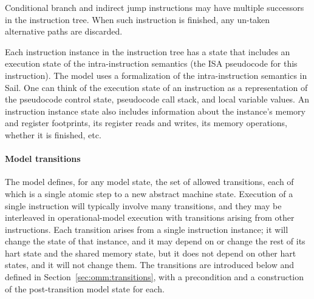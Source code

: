 Conditional branch and indirect jump instructions may have multiple successors in the instruction tree.
When such instruction is finished, any un-taken alternative paths are discarded.

Each instruction instance in the instruction tree has a state that
includes an execution state of the intra-instruction semantics (the
ISA pseudocode for this instruction).
The model uses a formalization of the intra-instruction semantics in Sail.
One can think of the execution state of an instruction as a representation of the pseudocode control state, pseudocode call stack, and local variable values.
An instruction instance state also includes information about the instance's memory and register footprints, its register reads and writes, its memory operations, whether it is finished, etc.

\paragraph{Model transitions}
The model defines, for any model state, the set of allowed transitions, each of which is a single atomic step to a new abstract machine state.
Execution of a single instruction will typically involve many
transitions, and they may be interleaved in operational-model
execution with transitions arising from other instructions. 
Each transition arises from a single instruction instance; it will
change the state of that instance, and it may depend on or change the
rest of its hart state and the shared memory state, but it does not depend on other hart states, and it will not change them.
The transitions are introduced below and defined in Section~\ref{sec:omm:transitions}, with a precondition and a construction of the post-transition model state for each.

